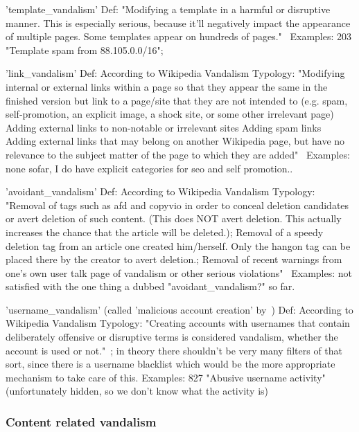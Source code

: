 'template\_vandalism'
  Def: "Modifying a template in a harmful or disruptive manner. This is especially serious, because it'll negatively impact the appearance of multiple pages. Some templates appear on hundreds of pages."~\cite{Wikipedia:VandalismTypes}
  Examples: 203 "Template spam from 88.105.0.0/16";

'link\_vandalism'
  Def: According to Wikipedia Vandalism Typology: "Modifying internal or external links within a page so that they appear the same in the finished version but link to a page/site that they are not intended to (e.g. spam, self-promotion, an explicit image, a shock site, or some other irrelevant page)
    Adding external links to non-notable or irrelevant sites
    Adding spam links
    Adding external links that may belong on another Wikipedia page, but have no relevance to the subject matter of the page to which they are added"~\cite{Wikipedia:VandalismTypes}
  Examples: none sofar, I do have explicit categories for seo and self promotion.. %

'avoidant\_vandalism'
  Def: According to Wikipedia Vandalism Typology: "Removal of tags such as {{afd}} and {{copyvio}} in order to conceal deletion candidates or avert deletion of such content. (This does NOT avert deletion. This actually increases the chance that the article will be deleted.); Removal of a {{speedy deletion}} tag from an article one created him/herself. Only the {{hangon}} tag can be placed there by the creator to avert deletion.; Removal of recent warnings from one's own user talk page of vandalism or other serious violations"~\cite{Wikipedia:VandalismTypes}
  Examples: not satisfied with the one thing a dubbed "avoidant\_vandalism?" so far.

'username\_vandalism' (called 'malicious account creation' by~\cite{Wikipedia:VandalismTypes})
  Def: According to Wikipedia Vandalism Typology: "Creating accounts with usernames that contain deliberately offensive or disruptive terms is considered vandalism, whether the account is used or not."~\cite{Wikipedia:VandalismTypes}; in theory there shouldn't be very many filters of that sort, since there is a username blacklist which would be the more appropriate mechanism to take care of this.
  Examples: 827 "Abusive username activity" (unfortunately hidden, so we don't know what the activity is)

\subsubsection{Content related vandalism}

